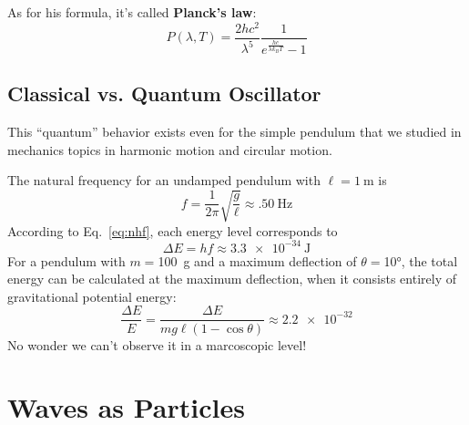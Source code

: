 \documentclass[11pt]{article}
\begin{document}
As for his formula, it's called \textbf{Planck's law}:
\begin{equation}
  \boxed{
    P(\lambda,T)=\frac{2hc^2}{\lambda^5}\frac{1}{e^{\frac{hc}{\lambda k_BT}}-1}
  }
\end{equation}

\subsection{Classical vs. Quantum Oscillator}
This ``quantum'' behavior exists even for the simple pendulum that we studied
in mechanics topics in harmonic motion and circular motion.
\begin{figure}[ht]
  \centering
\end{figure}
The natural frequency for an undamped pendulum with $\ell=\SI{1}{\metre}$ is
\begin{equation*}
  f=\frac{1}{2\pi}\sqrt{\frac{g}{\ell}}\approx\SI{.50}{\hertz}
\end{equation*}
According to Eq.~\ref{eq:nhf}, each energy level corresponds to 
\begin{displaymath}
  \Delta E=hf\approx\SI{3.3e-34}{\joule}
\end{displaymath}
For a pendulum with $m=$\SI{100}{\gram} and a maximum deflection of
$\theta=$\ang{10}, the total energy can be calculated at the maximum deflection,
when it consists entirely of gravitational potential energy:
\begin{displaymath}
  \frac{\Delta E}{E}=\frac{\Delta E}{mg\ell(1-\cos\theta)}
  \approx\num{2.2e-32}
\end{displaymath}
No wonder we can't observe it in a marcoscopic level!


\section{Waves as Particles}
\end{document}
